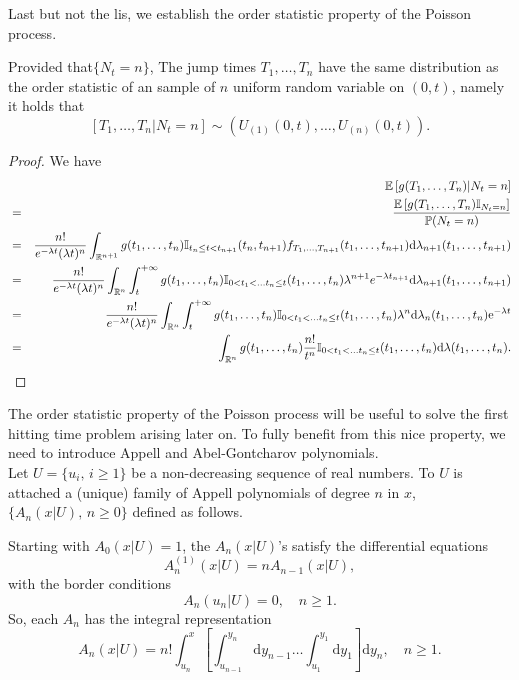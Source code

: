 Last but not the lis, we establish the order statistic property of the Poisson process.
\begin{prop}
Provided that$\{N_t=n\}$, The jump times $T_1,\ldots,T_n$ have the same distribution as the order statistic of an \iid sample of $n$ uniform random variable on $(0,t)$, namely it holds that
$$
[T_1,\ldots,T_n|N_t=n]\sim \left(U_{(1)}(0,t),\ldots, U_{(n)}(0,t)\right).
$$
\end{prop}
\begin{proof}
We have
\begin{eqnarray*}
&&\mathbb{E}\left[g(T_1,\ldots, T_n)|N_t = n\right]\\
&=&\frac{\mathbb{E}\left[g(T_1,\ldots, T_n)\mathbb{I}_{N_t = n}\right]}{\mathbb{P}(N_t = n)}\\
&=&\frac{n!}{e^{-\lambda t}(\lambda t)^n}\int_{\mathbb{R}^{n+1}}g(t_1,\ldots, t_n)\mathbb{I}_{t_n\leq t<t_{n+1}}(t_n,t_{n+1})f_{T_1,\ldots, T_{n+1}}(t_1,\ldots, t_{n+1})\text{d}\lambda_{n+1}(t_1,\ldots, t_{n+1})\\
&=&\frac{n!}{e^{-\lambda t}(\lambda t)^n}\int_{\mathbb{R}^{n}}\int_{t}^{+\infty}g(t_1,\ldots, t_n)\mathbb{I}_{0<t_1<\ldots t_n\leq t}(t_1,\ldots,t_{n})\lambda^{n+1} e^{-\lambda t_{n+1}}\text{d}\lambda_{n+1}(t_1,\ldots, t_{n+1})\\
&=&\frac{n!}{e^{-\lambda t}(\lambda t)^n}\int_{\mathbb{R}^{n}}\int_{t}^{+\infty}g(t_1,\ldots, t_n)\mathbb{I}_{0<t_1<\ldots t_n\leq t}(t_1,\ldots,t_{n})\lambda^{n} \text{d}\lambda_{n}(t_1,\ldots,t_n)\mathrm{e}^{-\lambda t}\\
 &=&\int_{\mathbb{R}^{n}}g(t_1,\ldots, t_n)\frac{n!}{t^n}\mathbb{I}_{0<t_1<\ldots t_n\leq t}(t_1,\ldots,t_{n})\text{d}\lambda(t_1,\ldots,t_{n} ).
\end{eqnarray*}
\end{proof}
\noindent The order statistic property of the Poisson process will be useful to solve the first hitting time problem arising later on. To fully benefit from this nice property, we need to introduce Appell and Abel-Gontcharov polynomials.\\

\noindent Let $U=\{u_i, \, i\geq 1\}$ be a non-decreasing sequence of real numbers. To $U$ is attached a (unique) family of Appell polynomials of degree $n$ in $x$, $\{A_{n}(x\vert U),\, n\geq 0\}$ defined as follows.
\begin{definition} 
Starting with $A_0(x\vert U)=1$, the $A_n(x\vert U)$'s satisfy the differential equations
\begin{equation}\label{eq:DifferentialEquationAppellPolynomial}
A_{n}^{(1)}(x|U)=nA_{n-1}(x|U),  
\end{equation}
with the border conditions
\begin{equation}\label{eq:Border AppellPolynomial}
A_{n}(u_{n}|U)=0, \quad n\geq 1.
\end{equation}
So, each $A_n$ has the integral representation
\begin{equation}\label{eq:IntegralRepresentationAppellPolynomials}
A_{n}(x|U)=n!\int_{u_{n}}^{x}\left[\int_{u_{n-1}}^{y_{n}}\text{d}y_{n-1} \ldots \int_{u_{1}}^{y_{1}}\text{d}y_{1}\right]\text{d}y_{n}, \quad n\geq 1.
\end{equation}
\end{definition}

